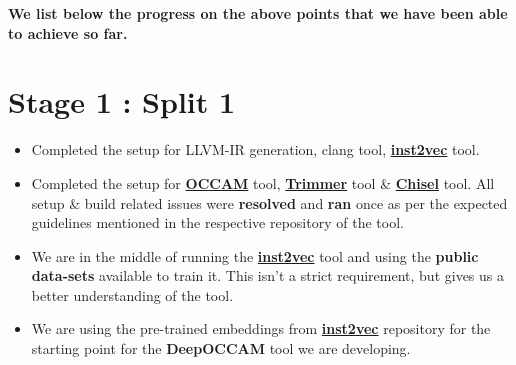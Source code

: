 \documentclass{article} %
\begin{document}
\textbf{\color{azure(colorwheel)} We list below the progress on the above points that we have been able to achieve so far.}

\section*{\color{darkmidnightblue} Stage 1 : Split 1} 
\begin{itemize}
    \item Completed the setup for LLVM-IR generation, clang tool, \textbf{\href{https://github.com/lahiri-phdworks/ncc}{inst2vec}} tool. 
    \item Completed the setup for \textbf{\href{https://github.com/ashish-gehani/OCCAM}{OCCAM}} tool, \textbf{\href{http://www.csl.sri.com/users/gehani/papers/ASE-2018.Trimmer.pdf}{Trimmer}} tool \& \textbf{\href{https://github.com/aspire-project/chisel}{Chisel}} tool. All setup \& build related issues were \textbf{\color{ao(english)}resolved} and \textbf{\color{ao(english)}ran} once as per the expected guidelines mentioned in the respective repository of the tool. 
	\item We are in the middle of running the \textbf{\href{https://github.com/lahiri-phdworks/ncc}{inst2vec}} tool and using the \textbf{public data-sets} available to train it. This isn't a strict requirement, but gives us a better understanding of the tool.  
	\item We are using the pre-trained embeddings from \textbf{\href{https://github.com/lahiri-phdworks/ncc}{inst2vec}} repository for the starting point for the \textbf{DeepOCCAM} tool we are developing.
\end{itemize}
\end{document}
